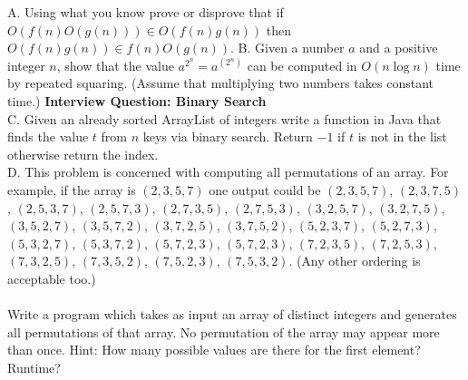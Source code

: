 \documentclass[12pt]{article}
\begin{document}
\noindent A. Using what you know prove or disprove that if $O(f(n)O(g(n)))\in O(f(n)g(n))$ then $O(f(n)g(n)) \in f(n)O(g(n))$.
\newpage
\noindent B. Given a number $a$ and a positive integer $n$, show that the value $a^{2^n}=a^{(2^{n})}$ can be computed in $O(n\log{n})$ time by repeated squaring. (Assume that multiplying two numbers takes constant time.)
\newpage
\noindent\textbf{Interview Question: Binary Search}\\
\noindent C. Given an already sorted ArrayList of integers write a function in Java that finds the value $t$ from $n$ keys via binary search. Return $-1$ if $t$ is not in the list otherwise return the index.\\
\newpage
\noindent D. This problem is concerned with computing all permutations of an array. For example,
if the array is $(2,3,5, 7)$ one output could be $(2,3,5, 7)$, $(2,3,7,5)$, $(2,5,3, 7)$, $(2,5, 7,3)$,
$(2,7,3,5)$, $(2,7,5,3)$, $(3,2,5,7)$, $(3,2,7,5)$, $(3,5,2,7)$, $(3,5,7,2)$, $(3,7,2,5)$, $(3,7,5,2)$,
$(5, 2,3, 7)$, $(5,2,7,3)$, $(5,3,2,7)$, $(5,3,7,2)$, $(5,7,2,3)$, $(5,7,2,3)$, $(7,2,3,5)$, $(7,2,5,3)$,
$(7,3, 2,5)$, $(7,3,5, 2)$, $(7,5, 2,3)$, $(7,5,3, 2)$. (Any other ordering is acceptable too.)\\\\
Write a program which takes as input an array of distinct integers and generates all
permutations of that array. No permutation of the array may appear more than once.
Hint: How many possible values are there for the first element? Runtime?\\
\end{document}
